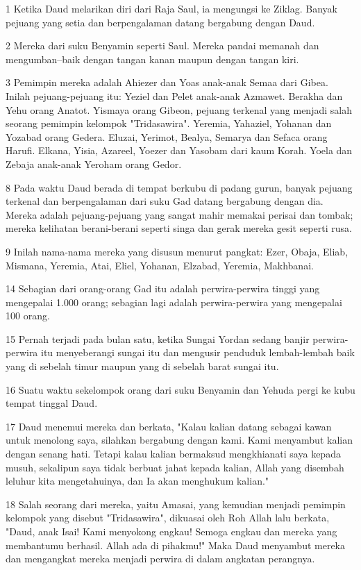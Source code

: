 \par 1 Ketika Daud melarikan diri dari Raja Saul, ia mengungsi ke Ziklag. Banyak pejuang yang setia dan berpengalaman datang bergabung dengan Daud.
\par 2 Mereka dari suku Benyamin seperti Saul. Mereka pandai memanah dan mengumban--baik dengan tangan kanan maupun dengan tangan kiri.
\par 3 Pemimpin mereka adalah Ahiezer dan Yoas anak-anak Semaa dari Gibea. Inilah pejuang-pejuang itu: Yeziel dan Pelet anak-anak Azmawet. Berakha dan Yehu orang Anatot. Yismaya orang Gibeon, pejuang terkenal yang menjadi salah seorang pemimpin kelompok "Tridasawira". Yeremia, Yahaziel, Yohanan dan Yozabad orang Gedera. Eluzai, Yerimot, Bealya, Semarya dan Sefaca orang Harufi. Elkana, Yisia, Azareel, Yoezer dan Yasobam dari kaum Korah. Yoela dan Zebaja anak-anak Yeroham orang Gedor.
\par 8 Pada waktu Daud berada di tempat berkubu di padang gurun, banyak pejuang terkenal dan berpengalaman dari suku Gad datang bergabung dengan dia. Mereka adalah pejuang-pejuang yang sangat mahir memakai perisai dan tombak; mereka kelihatan berani-berani seperti singa dan gerak mereka gesit seperti rusa.
\par 9 Inilah nama-nama mereka yang disusun menurut pangkat: Ezer, Obaja, Eliab, Mismana, Yeremia, Atai, Eliel, Yohanan, Elzabad, Yeremia, Makhbanai.
\par 14 Sebagian dari orang-orang Gad itu adalah perwira-perwira tinggi yang mengepalai 1.000 orang; sebagian lagi adalah perwira-perwira yang mengepalai 100 orang.
\par 15 Pernah terjadi pada bulan satu, ketika Sungai Yordan sedang banjir perwira-perwira itu menyeberangi sungai itu dan mengusir penduduk lembah-lembah baik yang di sebelah timur maupun yang di sebelah barat sungai itu.
\par 16 Suatu waktu sekelompok orang dari suku Benyamin dan Yehuda pergi ke kubu tempat tinggal Daud.
\par 17 Daud menemui mereka dan berkata, "Kalau kalian datang sebagai kawan untuk menolong saya, silahkan bergabung dengan kami. Kami menyambut kalian dengan senang hati. Tetapi kalau kalian bermaksud mengkhianati saya kepada musuh, sekalipun saya tidak berbuat jahat kepada kalian, Allah yang disembah leluhur kita mengetahuinya, dan Ia akan menghukum kalian."
\par 18 Salah seorang dari mereka, yaitu Amasai, yang kemudian menjadi pemimpin kelompok yang disebut "Tridasawira", dikuasai oleh Roh Allah lalu berkata, "Daud, anak Isai! Kami menyokong engkau! Semoga engkau dan mereka yang membantumu berhasil. Allah ada di pihakmu!" Maka Daud menyambut mereka dan mengangkat mereka menjadi perwira di dalam angkatan perangnya.
